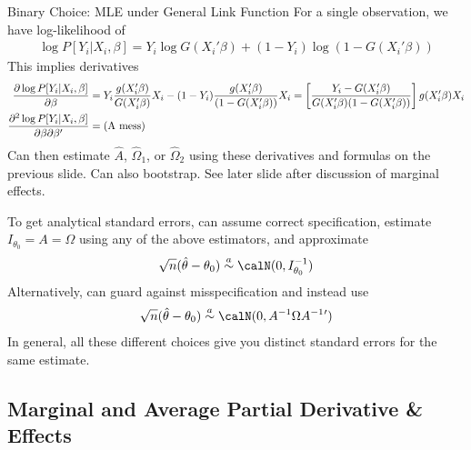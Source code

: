 \documentclass[aspectratio=169, handout]{beamer}
\begin{document}
{\scriptsize
\begin{frame}{Binary Choice: MLE under General Link Function}
For a single observation, we have log-likelihood of
\begin{align*}
  \log P[Y_i|X_i,\beta]
  =
  Y_i
  \log
  G(X_i'\beta)
  +
  (1-Y_i)
  \log
  (1-G(X_i'\beta))
\end{align*}
This implies derivatives
\begin{align*}
  \frac{\partial \log P[Y_i|X_i,\beta]}{\partial \beta}
  &=
  Y_i
  \frac{%
    g(X_i'\beta)
  }{%
    G(X_i'\beta)
  }
  X_i
  -
  (1-Y_i)
  \frac{%
    g(X_i'\beta)
  }{%
    (1-G(X_i'\beta))
  }
  X_i
  =
  \left[
  \frac{%
    Y_i
    -
    G(X_i'\beta)
  }{%
    G(X_i'\beta)
    (1-G(X_i'\beta))
  }
  \right]
  g(X_i'\beta)
  X_i
  \\
  \frac{\partial^2 \log P[Y_i|X_i,\beta]}{\partial \beta\partial \beta'}
  &=
  (\text{A mess})
\end{align*}
Can then estimate $\hat{A}$, $\hat{\Omega}_1$, or $\hat{\Omega}_2$
using these derivatives and formulas on the previous slide.
Can also bootstrap. See later slide after discussion of marginal
effects.

To get analytical standard errors, can assume \alert{correct
specification}, estimate $I_{\theta_0}=A=\Omega$ using any of the above
estimators, and approximate
\begin{align*}
  \sqrt{n}(\hat{\theta}-\theta_0)
  \overset{a}{\sim}
  \calN(0,I_{\theta_0}^{-1})
\end{align*}
Alternatively, can guard against misspecification and instead use
\begin{align*}
  \sqrt{n}(\hat{\theta}-\theta_0)
  \overset{a}{\sim}
  \calN(0,A^{-1}\Omega A^{-1}{}')
\end{align*}
In general, all these different choices give you distinct standard
errors for the same estimate.
\end{frame}
}


\subsection{Marginal and Average Partial Derivative \& Effects}
\end{document}
